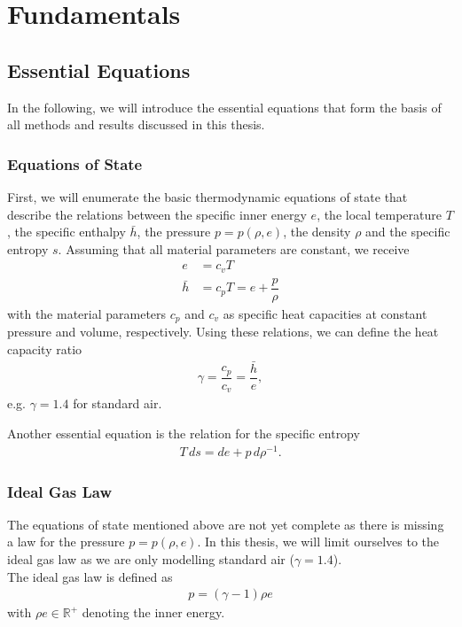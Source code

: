 \chapter{Fundamentals}
\label{fundamentals}
	\section{Essential Equations}
		In the following, we will introduce the essential equations that form the basis of all methods and results discussed in this thesis. 
		\subsection{Equations of State}
		\label{EOS}
		First, we will enumerate the basic thermodynamic equations of state that describe the relations between the specific inner energy $e$, the local temperature $T$, the specific enthalpy $\bar{h}$, the pressure $p = p (\rho , e)$, the density $\rho$ and the specific entropy $s$.
		Assuming that all material parameters are constant, we receive
		\begin{align}
			e &= c_v T \\
			\bar{h} &= c_p T = e + \dfrac{p}{\rho}
		\end{align}
		with the material parameters $c_p$ and $c_v$ as specific heat capacities at constant pressure and volume, respectively. Using these relations, we can define the heat capacity ratio 
		\begin{align}
			\gamma = \dfrac{c_p}{c_v} = \dfrac{\bar{h}}{e}, 
		\end{align}
		e.g. $\gamma = 1.4$ for standard air.
		
		Another essential equation is the relation for the specific entropy 
		\begin{align}
			T \, ds = de + p \, d\rho^{-1}.
		\end{align}
		
		\subsection{Ideal Gas Law}
		The equations of state mentioned above are not yet complete as there is missing a law for the pressure $p = p (\rho , e)$. In this thesis, we will limit ourselves to the ideal gas law as we are only modelling standard air ($\gamma = 1.4$). \\
		The ideal gas law is defined as
		\begin{align}
			p = (\gamma - 1) \rho e
		\end{align}
		with $\rho e \in \mathbb{R}^+$ denoting the inner energy. \\
		
